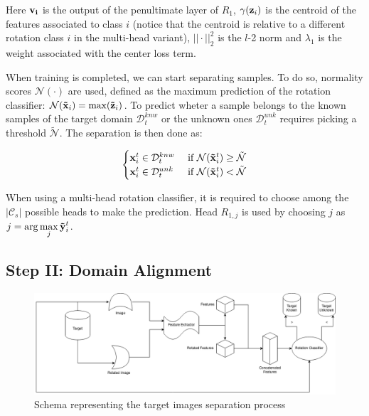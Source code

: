\documentclass[10pt,twocolumn,letterpaper]{article}
\begin{document}
Here ${\bf v_i}$ is the output of the penultimate layer of $R_1$,
$\gamma({\bf z}_i)$ is the centroid of the features associated to class $i$
(notice that the centroid is relative to a different rotation class $i$ in the multi-head variant),
$||\cdot||_2^2$ is the $l$-2 norm and $\lambda_1$ is the weight associated with the center loss term.

When training is completed, 
we can start separating samples.
To do so,
normality scores $\mathcal{N}(\cdot)$ are used,
defined as the maximum prediction of the rotation classifier:
$\mathcal{N}({\bf\tilde{x}}_i) = \max({\bf\tilde{z}}_i)$.
To predict wheter a sample belongs to the known samples of the target domain $\mathcal{D}_t^{knw}$ or the unknown ones $\mathcal{D}_t^{unk}$ requires picking a threshold $\tilde{\mathcal{N}}$.
The separation is then done as:

\begin{equation}
  \begin{cases}
    {\bf x}_i^t \in \mathcal{D}_t^{knw} & \text{ if } \mathcal{N}({\bf\tilde x}_i^t) \geq \tilde{\mathcal{N}} \\
    {\bf x}_i^t \in \mathcal{D}_t^{unk} & \text{ if } \mathcal{N}({\bf\tilde x}_i^t) < \tilde{\mathcal{N}}
  \end{cases}
  \label{eq:sample_separation}
\end{equation}

When using a multi-head rotation classifier, 
it is required to choose among the $|\mathcal{C}_s|$ possible heads to make the prediction.
Head $R_{1,j}$ is used by choosing $j$ as $\displaystyle j = \arg\max_j {\bf\tilde{y}}_i^t$.

\subsection{Step II: Domain Alignment}
\label{sec:domain_alignment}

\begin{figure}
  \includegraphics[width=\textwidth ]{scheme.png}
  \caption{\label{fig:separation} Schema representing the target images separation process}
\end{figure}
\end{document}
